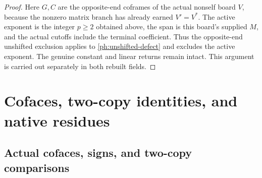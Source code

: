 \documentclass[11pt,a4paper]{amsart}
\numberwithin{equation}{section}
\theoremstyle{plain}
\theoremstyle{definition}
\begin{document}
\begin{proof}
Here \(G,C\) are the opposite-end coframes of the actual nonself
board \(V\), because the nonzero matrix branch has already earned
\(V'=V^*\).  The active exponent is the integer \(p\ge2\) obtained
above, the span is this board's supplied \(M\), and the actual cutoffs
include the terminal coefficient.  Thus the opposite-end unshifted
exclusion \cite{Shields2026Coframes} applies to
\eqref{ph:unshifted-defect} and excludes the active exponent.
The genuine constant and linear returns remain intact.
This argument is carried out separately in both rebuilt fields.
\end{proof}

\section{Cofaces, two-copy identities, and native residues}\label{app:cofaces}

\subsection{Actual cofaces, signs, and two-copy comparisons}
\end{document}
